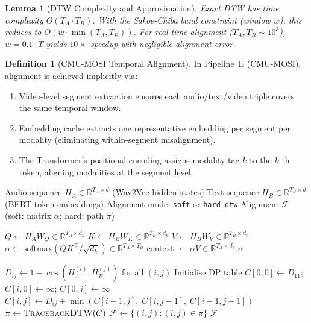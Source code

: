 \documentclass[12pt,a4paper]{article}
\theoremstyle{definition}
\newtheorem{definition}{Definition}[section]
\theoremstyle{plain}
\newtheorem{lemma}[theorem]{Lemma}
\theoremstyle{remark}
\newcommand{\R}{\mathbb{R}}
\newcommand{\softmax}{\mathrm{softmax}}
\begin{document}
\begin{lemma}[DTW Complexity and Approximation]
Exact DTW has time complexity $O(T_A \cdot T_B)$. With the Sakoe-Chiba band constraint (window $w$), this reduces to $O(w \cdot \min(T_A, T_B))$. For real-time alignment ($T_A, T_B \sim 10^3$), $w = 0.1 \cdot T$ yields $10\times$ speedup with negligible alignment error.
\end{lemma}

\begin{definition}[CMU-MOSI Temporal Alignment]
In Pipeline~E (CMU-MOSI), alignment is achieved implicitly via:
\begin{enumerate}[nosep]
  \item Video-level segment extraction ensures each audio/text/video triple covers the same temporal window.
  \item Embedding cache extracts one representative embedding per segment per modality (eliminating within-segment misalignment).
  \item The Transformer's positional encoding assigns modality tag $k$ to the $k$-th token, aligning modalities at the segment level.
\end{enumerate}
\end{definition}

\begin{algorithm}[H]
\caption{Challenge 5: Multimodal Alignment (Soft + Hard)}
\label{alg:align_soft}
\begin{algorithmic}[1]
\Require Audio sequence $H_A \in \R^{T_A \times d}$ (Wav2Vec hidden states)
\Require Text sequence $H_B \in \R^{T_B \times d}$ (BERT token embeddings)
\Require Alignment mode: \texttt{soft} or \texttt{hard\_dtw}
\Ensure Alignment $\mathcal{F}$ (soft: matrix $\alpha$; hard: path $\pi$)

 
  \State $Q \gets H_A W_Q \in \R^{T_A \times d_k}$ 
  \State $K \gets H_B W_K \in \R^{T_B \times d_k}$ 
  \State $V \gets H_B W_V \in \R^{T_B \times d_v}$ 
  \State $\alpha \gets \softmax(QK^\top / \sqrt{d_k}) \in \R^{T_A \times T_B}$ 
  \State context $\gets \alpha V \in \R^{T_A \times d_v}$ 
  \State \Return $\alpha$ 
\EndIf

 
  \State $D_{ij} \gets 1 - \cos(H_A^{(i)}, H_B^{(j)})$ for all $(i,j)$ 
  \State Initialise DP table $C[0,0] \gets D_{11}$; $C[i,0] \gets \infty$; $C[0,j] \gets \infty$
      \State $C[i,j] \gets D_{ij} + \min(C[i-1,j],\; C[i,j-1],\; C[i-1,j-1])$
    \EndFor
  \EndFor
  \State $\pi \gets \textsc{TracebackDTW}(C)$ 
  \State $\mathcal{F} \gets \{(i,j) : (i,j) \in \pi\}$
  \State \Return $\mathcal{F}$
\EndIf
\end{algorithmic}
\end{algorithm}
\end{document}
